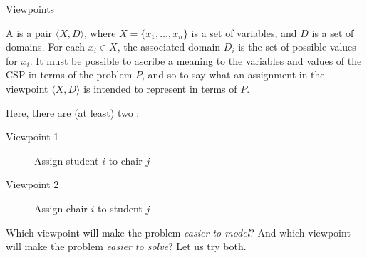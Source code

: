\documentclass{cons-beamer}
\begin{document}
\begin{frame}{Viewpoints}

  \begin{definition}
    A  is a pair \(\langle X, D \rangle\), where \(X = \{x_1, \ldots, x_n\}\) is a set of variables, and \(D\) is a set of domains.
    For each \(x_i \in X\), the associated domain \(D_i\) is the set of possible values for \(x_i\).
    It must be possible to ascribe a meaning to the variables and values of the CSP in terms of the problem \(P\), and so to say what an assignment in the viewpoint \(\langle X, D \rangle\) is intended to represent in terms of \(P\).
  \end{definition}

  \parBreak

  Here, there are (at least) two :

  \parBreak

  \begin{description}
    \item[Viewpoint 1] Assign student $i$ to chair $j$
    \item[Viewpoint 2] Assign chair $i$ to student $j$
  \end{description}

  \parBreak
  Which viewpoint will make the problem \emph{easier to model}?
  And which viewpoint will make the problem \emph{easier to solve}?
  Let us try both.

\end{frame}
\end{document}
